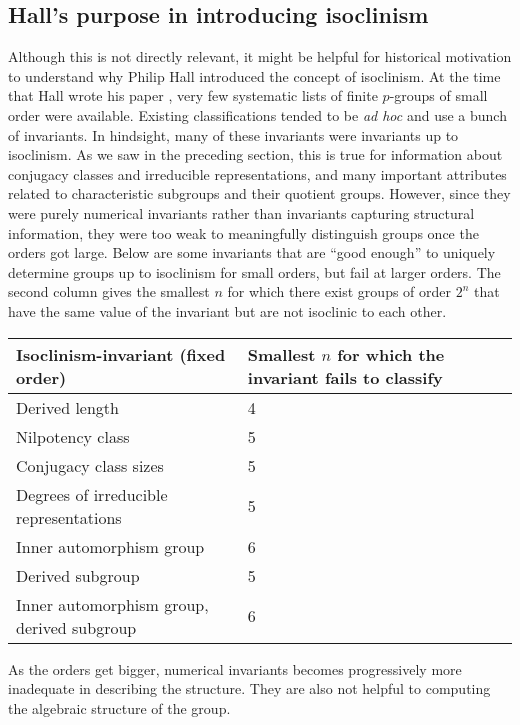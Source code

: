 \documentclass{ucetd}
\begin{document}
\subsection{Hall's purpose in introducing isoclinism}

Although this is not directly relevant, it might be helpful for
historical motivation to understand why Philip Hall introduced the
concept of isoclinism. At the time that Hall wrote his paper
\cite{Hall37}, very few systematic lists of finite $p$-groups of small
order were available. Existing classifications tended to be {\em ad
  hoc} and use a bunch of invariants. In hindsight, many of these
invariants were invariants up to isoclinism. As we saw in the
preceding section, this is true for information about conjugacy
classes and irreducible representations, and many important attributes
related to characteristic subgroups and their quotient
groups. However, since they were purely numerical invariants rather
than invariants capturing structural information, they were too weak
to meaningfully distinguish groups once the orders got large. Below
are some invariants that are ``good enough'' to uniquely determine
groups up to isoclinism for small orders, but fail at larger
orders. The second column gives the smallest $n$ for which there exist
groups of order $2^n$ that have the same value of the invariant but
are not isoclinic to each other.

\vspace{0.3in}

\begin{tabular}{|l|l|l|}
  \hline
  Isoclinism-invariant (fixed order) & Smallest $n$ for which the invariant fails to classify \\\hline
  Derived length & 4 \\\hline
  Nilpotency class & 5 \\\hline
  Conjugacy class sizes & 5 \\\hline
  Degrees of irreducible representations & 5 \\\hline
  Inner automorphism group & 6 \\\hline
  Derived subgroup & 5 \\\hline
  Inner automorphism group, derived subgroup & 6 \\\hline
\end{tabular}

\vspace{0.3in}

As the orders get bigger, numerical invariants becomes progressively
more inadequate in describing the structure. They are also not helpful
to computing the algebraic structure of the group.
\end{document}
